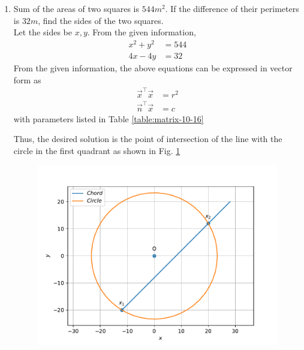 \documentclass[journal,12pt,twocolumn]{IEEEtran}
\begin{document}
\begin{enumerate}
\begin{enumerate}
	  \end{enumerate}
        \item Sum of the areas of two squares is $544 m^2$. If the difference of their perimeters is $32m$, find the sides of the two squares.\\
		\solution Let the sides be $x, y$.  From the given information, 
		    \begin{align}
			    x^2 +y^2 &= 544
			    \\
			    4x - 4y &= 32
		    \end{align}
		    From the given information, the above equations can be expressed in vector form as 
		    \begin{align}
			    \label{eq:cbse-2020-circ}
			    \vec{x}^{\top}\vec{x} &= r^2
			    \\
			    \vec{n}^{\top}\vec{x} &= c
		    \end{align}
with parameters listed in 	Table \eqref{table:matrix-10-16}
\begin{table}[ht!]
	
\caption{}
	\label{table:matrix-10-16}
\end{table}
		    Thus, the desired solution is the point of intersection of the line with the circle in the first quadrant as shown in Fig.  
	  \ref{fig:matrix-10-16.pdf}
  \begin{figure}
	  \centering 
	  \includegraphics[width=\columnwidth]{figs/matrix-10-16.pdf}
	  \caption{}
	  \label{fig:matrix-10-16.pdf}
	  \end{figure}



\end{enumerate}
\end{document}
